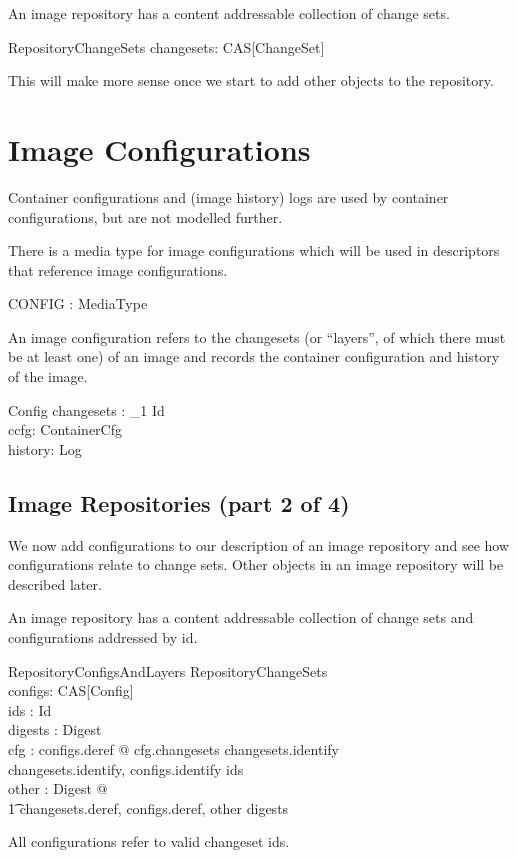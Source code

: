 \documentclass[a4paper,twoside,12pt]{article}
\begin{document}
An image repository has a content addressable collection of change sets.
\begin{schema}{RepositoryChangeSets}
  changesets: CAS[ChangeSet] \\
\end{schema}
This will make more sense once we start to add other objects to the repository.

\newpage
\section{Image Configurations}

Container configurations and (image history) logs are used by container configurations, but are not modelled further.
\begin{zed}
\end{zed}

There is a media type for image configurations which will be used in descriptors that reference image configurations.
\begin{axdef}
  CONFIG : MediaType \\
\end{axdef}

An image configuration refers to the changesets (or ``layers'', of which there must be at least one) of an image and records the container configuration and history of the image.
\begin{schema}{Config}
  changesets : \seq_1 Id \\
  ccfg: ContainerCfg \\
  history: \seq Log \\
\end{schema}

\subsection{Image Repositories (part 2 of 4)}

We now add configurations to our description of an image repository and see how configurations relate to change sets. Other objects in an image repository will be described later.

An image repository has a content addressable collection of change sets and configurations addressed by id.
\begin{schema}{RepositoryConfigsAndLayers}
  RepositoryChangeSets \\
  configs: CAS[Config] \\
  ids : \power Id \\
  digests : \power Digest \\
\where
  \forall cfg : \ran configs.deref @ \ran cfg.changesets \subseteq \dom changesets.identify \\
  \langle \dom changesets.identify, \dom configs.identify \rangle \partition ids \\
  \exists other : \power Digest @ \\
  \t1 \langle \dom changesets.deref, \dom configs.deref, other \rangle \partition digests \\
\end{schema}
All configurations refer to valid changeset ids.
\end{document}
